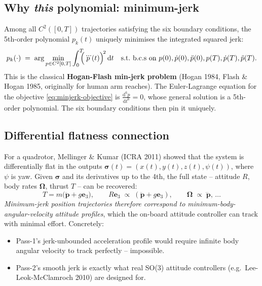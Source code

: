 \documentclass[11pt]{article}
\newcommand{\dt}{\,\mathrm{d}t}
\begin{document}
\subsection{Why \emph{this} polynomial: minimum-jerk}

Among all $C^2([0,T])$ trajectories satisfying the six boundary conditions, the 5th-order polynomial $p_k(t)$ uniquely minimises the integrated squared jerk:
\begin{equation}\label{eq:minjerk-objective}
p_k(\cdot) \;=\; \arg\min_{p \in C^2[0,T]} \int_0^T \!\!\!\Bigl(\dddot{p}(t)\Bigr)^{\!2} \dt \quad\text{s.t.\ b.c.s\ on }p(0),\dot{p}(0),\ddot{p}(0),p(T),\dot{p}(T),\ddot{p}(T).
\end{equation}
This is the classical \textbf{Hogan-Flash min-jerk problem} (Hogan 1984, Flash \& Hogan 1985, originally for human arm reaches).  The Euler-Lagrange equation for the objective \eqref{eq:minjerk-objective} is $\frac{\mathrm{d}^6 p}{\mathrm{d}t^6} = 0$, whose general solution is a 5th-order polynomial.  The six boundary conditions then pin it uniquely.

\subsection{Differential flatness connection}

For a quadrotor, Mellinger \& Kumar (ICRA 2011) showed that the system is differentially flat in the outputs $\bm{\sigma}(t) = (x(t), y(t), z(t), \psi(t))$, where $\psi$ is yaw.  Given $\bm{\sigma}$ and its derivatives up to the 4th, the full state -- attitude $R$, body rates $\bm{\Omega}$, thrust $T$ -- can be recovered:
\begin{equation}
T = m\bigl(\ddot{\bm{p}} + g \bm{e}_3\bigr), \qquad R \bm{e}_3 \;\propto\; (\ddot{\bm{p}} + g\bm{e}_3), \qquad \bm{\Omega} \;\propto\; \dddot{\bm{p}},\,\ldots
\end{equation}
\emph{Minimum-jerk position trajectories therefore correspond to minimum-body-angular-velocity attitude profiles}, which the on-board attitude controller can track with minimal effort.  Concretely:
\begin{itemize}
  \item Pass-1's jerk-unbounded acceleration profile would require infinite body angular velocity to track perfectly -- impossible.
  \item Pass-2's smooth jerk is exactly what real SO(3) attitude controllers (e.g.\ Lee-Leok-McClamroch 2010) are designed for.
\end{itemize}
\end{document}
